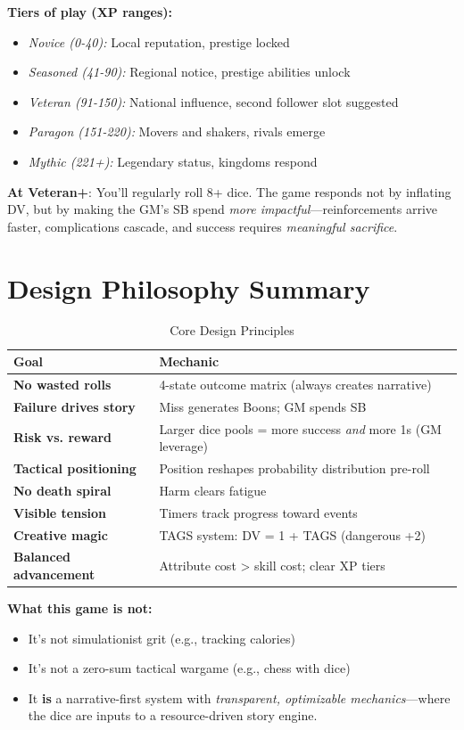 \documentclass[11pt]{article}
\begin{document}
\textbf{Tiers of play (XP ranges):}
\begin{itemize}
    \item \textit{Novice (0-40):} Local reputation, prestige locked
    \item \textit{Seasoned (41-90):} Regional notice, prestige abilities unlock
    \item \textit{Veteran (91-150):} National influence, second follower slot suggested
    \item \textit{Paragon (151-220):} Movers and shakers, rivals emerge
    \item \textit{Mythic (221+):} Legendary status, kingdoms respond
\end{itemize}
\textbf{At Veteran+}: You'll regularly roll 8+ dice. The game responds not by inflating DV, but by making the GM's SB spend \textit{more impactful}---reinforcements arrive faster, complications cascade, and success requires \textit{meaningful sacrifice}.

\section{Design Philosophy Summary}

\begin{table}[h]
\centering
\caption{Core Design Principles}
\begin{tabular}{>{\bfseries}l l}
\toprule
Goal & Mechanic \\
\midrule
No wasted rolls & 4-state outcome matrix (always creates narrative) \\
Failure drives story & Miss generates Boons; GM spends SB \\
Risk vs. reward & Larger dice pools = more success \textit{and} more 1s (GM leverage) \\
Tactical positioning & Position reshapes probability distribution pre-roll \\
No death spiral & Harm clears fatigue \\
Visible tension & Timers track progress toward events \\
Creative magic & TAGS system: DV = 1 + TAGS (dangerous +2) \\
Balanced advancement & Attribute cost > skill cost; clear XP tiers \\
\bottomrule
\end{tabular}
\end{table}

\textbf{What this game is not:}
\begin{itemize}
    \item It's not simulationist grit (e.g., tracking calories)
    \item It's not a zero-sum tactical wargame (e.g., chess with dice)
    \item It \textbf{is} a narrative-first system with \textit{transparent, optimizable mechanics}---where the dice are inputs to a resource-driven story engine.
\end{itemize}
\end{document}
